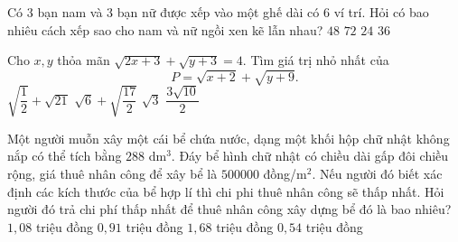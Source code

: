 \begin{ex}%
Có 3 bạn nam và 3 bạn nữ được xếp vào một ghế dài có 6 ví trí. Hỏi có bao nhiêu cách xếp sao cho nam và nữ ngồi xen kẽ lẫn nhau?
\choice
{$48$}
{\True $72$}
{$24$}
{$36$}
\end{ex}
\begin{ex}%
Cho $x,y$ thỏa mãn $\sqrt{2x+3}+\sqrt{y+3} =4$. Tìm giá trị nhỏ nhất của $$P=\sqrt{x+2}+\sqrt{y+9}.$$
\choice
{$\sqrt{\dfrac{1}{2}}+\sqrt{21}$}
{\True$\sqrt{6}+\sqrt{\dfrac{17}{2}}$}
{$\sqrt{3}$}
{ $\dfrac{3\sqrt{10}}{2}$}
\end{ex}
\begin{ex}%
Một người muỗn xây một cái bể chứa nước, dạng một khối hộp chữ nhật không nắp có thể tích bằng $288$ dm$^3$. Đáy bể hình chữ nhật có chiều dài gấp đôi chiều rộng, giá thuê nhân công để xây bể là $500000$ đồng/m$^2$. Nếu người đó biết xác định các kích thước của bể hợp lí thì chi phi thuê nhân công sẽ thấp nhất. Hỏi người đó trả chi phí thấp nhất để thuê nhân công xây dựng bể đó là bao nhiêu?
\choice
{\True $1,08$ triệu đồng}
{$0,91$ triệu đồng}
{$1,68$ triệu đồng}
{$0,54$ triệu đồng}
\end{ex}
